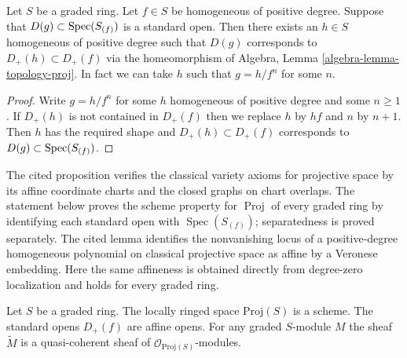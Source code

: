 \begin{lemma}
\label{lemma-standard-open-proj}
Let $S$ be a graded ring. Let $f \in S$ be homogeneous of positive degree.
Suppose that $D(g) \subset \mathop{\mathrm{Spec}}(S_{(f)})$ is a standard open.
Then there exists an $h \in S$ homogeneous of positive degree such that
$D(g)$ corresponds to $D_{+}(h) \subset D_{+}(f)$ via the homeomorphism
of Algebra, Lemma \ref{algebra-lemma-topology-proj}. In fact we can
take $h$ such that $g = h/f^n$ for some $n$.
\end{lemma}

\begin{proof}
Write $g = h/f^n$ for some $h$ homogeneous of positive degree
and some $n \geq 1$. If $D_{+}(h)$ is not contained in
$D_{+}(f)$ then we replace $h$ by $hf$ and $n$ by $n + 1$.
Then $h$ has the required shape and $D_{+}(h) \subset D_{+}(f)$
corresponds to $D(g) \subset \mathop{\mathrm{Spec}}(S_{(f)})$.
\end{proof}

\begin{lemma}
\label{lemma-proj-scheme}
\begin{reference}
\cite[Chapter III, \S 1, no. 51, Proposition 1, p. 244]{FAC}
\cite[Chapter III, \S 1, no. 52, Lemma 2, p. 245]{FAC}
\end{reference}
\begin{history}
The cited proposition verifies the classical variety axioms for projective
space by its affine coordinate charts and the closed graphs on chart
overlaps. The statement below proves the scheme property for $\operatorname{Proj}$
of every graded ring by identifying each standard open with
$\operatorname{Spec}(S_{(f)})$; separatedness is proved separately. The cited
lemma identifies the nonvanishing locus of a positive-degree homogeneous
polynomial on classical projective space as affine by a Veronese embedding.
Here the same affineness is obtained directly from degree-zero localization
and holds for every graded ring.
\end{history}
Let $S$ be a graded ring.
The locally ringed space $\text{Proj}(S)$ is a scheme.
The standard opens $D_{+}(f)$ are affine opens.
For any graded $S$-module $M$ the sheaf
$\widetilde M$ is a quasi-coherent sheaf of
$\mathcal{O}_{\text{Proj}(S)}$-modules.
\end{lemma}

